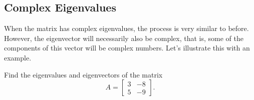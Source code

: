 \subsection{Complex Eigenvalues}

When the matrix has complex eigenvalues, the process is very similar to before. However, the eigenvector will necessarily also be complex, that is, some of the components of this vector will be complex numbers. Let's illustrate this with an example.

\begin{example}
Find the eigenvalues and eigenvectors of the matrix
\[ A = \begin{bmatrix} 3 & -8 \\ 5 & -9 \end{bmatrix}.\]
\end{example}


